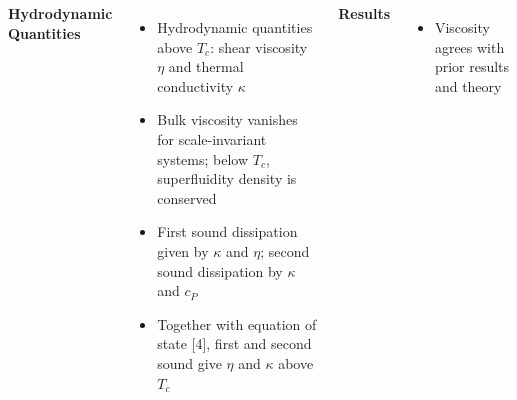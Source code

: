 \documentclass[26pt, paperwidth=36in,paperheight=48in]{tikzposter} %
\newcommand{\myfont}{\fontsize{24}{30}\selectfont}
\begin{document}
\begin{columns}
	
	
	
	
	\note[targetoffsetx=-15cm, targetoffsety=-6.8cm, angle=0, radius=0cm,
	width=0.1cm, rotate=-90, connection, linewidth=0cm,
	roundedcorners=0, innersep=0cm]{
		
		
		
	}


	
	
	
	

	
	\block[]{\textcolor{BEC1blue}{Hydrodynamics -- Transport Properties}}
	{
		\begin{minipage}{0.38\textwidth}
			\flushleft
			\textbf{Hydrodynamic Quantities}
			\vspace{0.5cm}
			\myfont
			\begin{itemize}
				\item Hydrodynamic quantities above $T_c$: shear viscosity $\eta$ and thermal conductivity $\kappa$
				
				\item Bulk viscosity vanishes for scale-invariant systems; below $T_c$, superfluidity density is conserved 
				
				\item First sound dissipation given by $\kappa$ and $\eta$; second sound dissipation by $\kappa$ and $c_P$
				
				\item Together with equation of state [4], first and second sound give $\eta$ and $\kappa$ above $T_c$
			\end{itemize}
		\end{minipage}
		
		\vspace{-1cm}
	
	
	
	\vspace{-2cm}
	\begin{minipage}{0.16\textwidth}
		\flushleft
		\textbf{Results}
		\vspace{0.5cm}
		\myfont
		\begin{itemize}
			\item Viscosity agrees with prior results and theory
			

\end{itemize}
\end{minipage}}
\end{columns}
\end{document}
